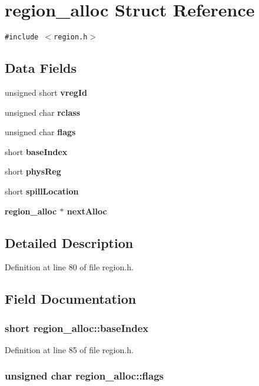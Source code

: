 \section{region\_\-alloc Struct Reference}
\label{structregion__alloc}
{\tt \#include $<$region.h$>$}

\subsection*{Data Fields}
\begin{CompactItemize}
\item 
unsigned short \bf{vreg\-Id}
\item 
unsigned char \bf{rclass}
\item 
unsigned char \bf{flags}
\item 
short \bf{base\-Index}
\item 
short \bf{phys\-Reg}
\item 
short \bf{spill\-Location}
\item 
\bf{region\_\-alloc} $\ast$ \bf{next\-Alloc}
\end{CompactItemize}


\subsection{Detailed Description}




Definition at line 80 of file region.h.

\subsection{Field Documentation}
\subsubsection{\setlength{\rightskip}{0pt plus 5cm}short \bf{region\_\-alloc::base\-Index}}\label{structregion__alloc_ee01be5f608f5890d369f387e0f60166}




Definition at line 85 of file region.h.
\subsubsection{\setlength{\rightskip}{0pt plus 5cm}unsigned char \bf{region\_\-alloc::flags}}\label{structregion__alloc_e0cbf100f67f0c45922ae5e85c354740}





